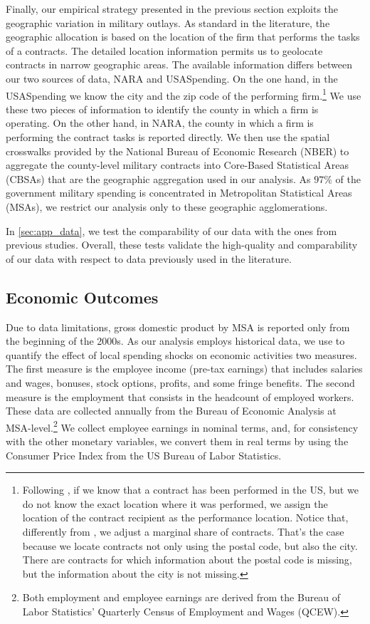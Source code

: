 \documentclass[dv_diss_main.tex]{subfiles}
\begin{document}
Finally, our empirical strategy presented in the previous section exploits the geographic variation in military outlays. As standard in the literature, the geographic allocation is based on the location of the firm that performs the tasks of a contracts. The detailed location information permits us to geolocate contracts in narrow geographic areas. The available information differs between our two sources of data, NARA and USASpending. On the one hand, in the USASpending we know the city and the zip code of the performing firm.\footnote{Following  \cite{Demyanyk2019}, if we know that a contract has been performed in the US, but we do not know the exact location where it was performed, we assign the location of the contract recipient as the performance location. Notice that, differently from \cite{Demyanyk2019}, we adjust a marginal share of contracts. That's the case because we locate contracts not only using the postal code, but also the city. There are contracts for which information about the postal code is missing, but the information about the city is not missing.} We use these two pieces of information to identify the county in which a firm is operating. On the other hand, in NARA, the county in which a firm is performing the contract tasks is reported directly. We then use the spatial crosswalks provided by the National Bureau of Economic Research (NBER) to aggregate the county-level military contracts into Core-Based Statistical Areas (CBSAs) that are the geographic aggregation used in our analysis. As $97\%$ of the government military spending is concentrated in Metropolitan Statistical Areas (MSAs), we restrict our analysis only to these geographic agglomerations.

In \ref{sec:app_data}, we test the comparability of our data with the ones from previous studies. Overall, these tests validate the high-quality and comparability of our data with respect to data previously used in the literature.

\subsection{Economic Outcomes}
\label{subsec:data_eco}


Due to data limitations, gross domestic product by MSA is reported only from the beginning of the 2000s. As our analysis employs historical data, we use to quantify the effect of local spending shocks on economic activities two measures. The first measure is the employee income (pre-tax earnings) that includes salaries and wages, bonuses, stock options, profits, and some fringe benefits. The second measure is the employment that consists in the headcount of employed workers. These data are collected annually from the Bureau of Economic Analysis at MSA-level.\footnote{Both employment and employee earnings are derived from the Bureau of Labor Statistics’ Quarterly Census of Employment and Wages (QCEW).} We collect  employee earnings in nominal terms, and, for consistency with the other monetary variables, we convert them in real terms by using the Consumer Price Index from the US Bureau of Labor Statistics.
\end{document}
